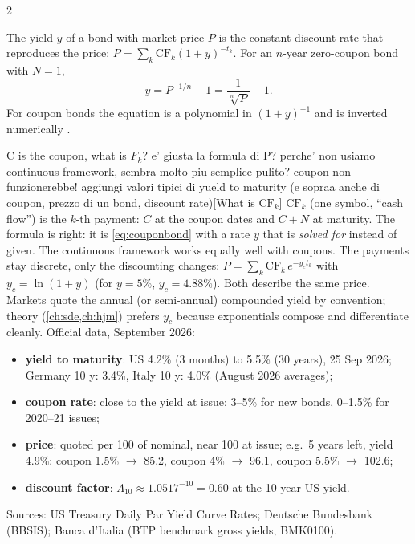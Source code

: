 \begin{paracol}{2}
\begin{definition}
The yield $y$ of a bond with market price $P$ is the constant discount rate that reproduces the
price: $P = \sum_k \mathrm{CF}_k (1+y)^{-t_k}$. For an $n$-year zero-coupon bond with $N=1$,
\[
  y = P^{-1/n} - 1 = \frac{1}{\sqrt[n]{P}} - 1 .
\]
For coupon bonds the equation is a polynomial in $(1+y)^{-1}$ and is inverted numerically
.
\end{definition}\begin{answer}{C is the coupon, what is $F_k$? e' giusta la formula di P? perche' non usiamo continuous framework, sembra molto piu semplice-pulito? coupon non funzionerebbe! aggiungi valori tipici di yueld to maturity (e sopraa anche di coupon, prezzo di un bond, discount rate)}[What is $\mathrm{CF}_k$]
$\mathrm{CF}_k$ (one symbol, ``cash flow'') is the $k$-th payment: $C$ at the coupon dates and $C+N$ at maturity.
The formula is right: it is \eqref{eq:couponbond} with a rate $y$ that is \emph{solved for} instead of given.
The continuous framework works equally well with coupons. The payments stay discrete, only the
discounting changes: $P=\sum_k \mathrm{CF}_k\,e^{-y_c t_k}$ with $y_c=\ln(1+y)$ (for $y=5\%$, $y_c=4.88\%$). Both
describe the same price. Markets quote the annual (or semi-annual) compounded yield by convention;
theory (\cref{ch:sde,ch:hjm}) prefers $y_c$ because exponentials compose and differentiate cleanly.
Official data, September 2026:
\begin{itemize}
  \item \textbf{yield to maturity}: US 4.2\% (3 months) to 5.5\% (30 years), 25 Sep 2026;
        Germany 10 y: 3.4\%, Italy 10 y: 4.0\% (August 2026 averages);
  \item \textbf{coupon rate}: close to the yield at issue: 3--5\% for new bonds, 0--1.5\% for 2020--21 issues;
  \item \textbf{price}: quoted per 100 of nominal, near 100 at issue; e.g.\ 5 years left, yield 4.9\%:
        coupon 1.5\% $\to$ 85.2, coupon 4\% $\to$ 96.1, coupon 5.5\% $\to$ 102.6;
  \item \textbf{discount factor}: $\Lambda_{10}\approx 1.0517^{-10}=0.60$ at the 10-year US yield.
\end{itemize}
Sources: US Treasury Daily Par Yield Curve Rates; Deutsche Bundesbank (BBSIS);
Banca d'Italia (BTP benchmark gross yields, BMK0100).
\end{answer}


\end{paracol}
